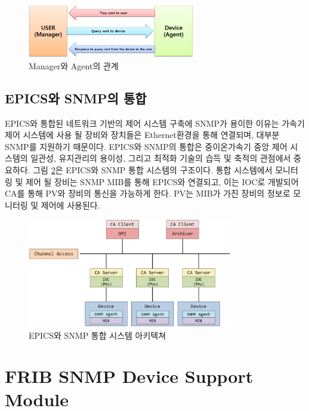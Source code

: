 \documentclass[11pt
  , a4paper
  , article
  , oneside
]{memoir}
\begin{document}
\begin{figure}[h!]
  \centering
  \includegraphics[width=0.65\textwidth]{./images/relationship_m_a.eps}
  \caption{Manager와 Agent의 관계}
  \label{fig:relationship_m_a}   
\end{figure}

\section{EPICS와 SNMP의 통합}
EPICS와 통합된 네트워크 기반의 제어 시스템 구축에 SNMP가 용이한 이유는 가속기 제어 시스템에 사용 될 장비와 장치들은 Ethernet환경을 통해 연결되며, 대부분 SNMP를 지원하기 때문이다. EPICS와 SNMP의 통합은 중이온가속기 중앙 제어 시스템의 일관성, 유지관리의 용이성, 그리고 최적화 기술의 습득 및 축적의 관점에서 중요하다. 그림 \ref{fig:architecture}은 EPICS와 SNMP 통합 시스템의 구조이다\citep{epicssnmp}. 통합 시스템에서 모니터링 및 제어 될 장비는 SNMP MIB를 통해 EPICS와 연결되고, 이는 IOC로 개발되어  CA를 통해 PV와 장비의 통신을 가능하게 한다. PV는 MIB가 가진 장비의 정보로 모니터링 및 제어에 사용된다. 

\begin{figure}[h!]
  \centering
  \includegraphics[width=0.8\textwidth]{./images/architecture.eps}
  \caption{EPICS와 SNMP 통합 시스템 아키텍쳐}
  \label{fig:architecture}   
\end{figure}

\chapter{FRIB SNMP Device Support Module}
\end{document}
